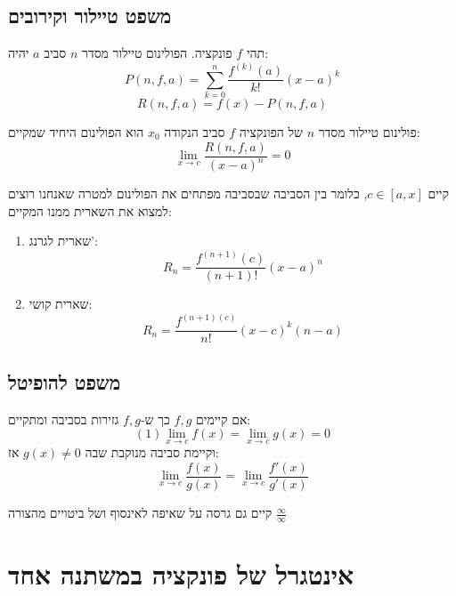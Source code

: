 \documentclass{tstextbook}
\begin{document}
\section{משפט טיילור וקירובים}

\begin{definition}
תהי \(f\) פונקציה. הפולינום טיילור מסדר \(n\) סביב \(a\) יהיה:
$$P(n,f,a)=\sum_{k=0}^n \frac{f^{(k)}(a)}{k!}(x-a)^k$$$$R(n,f,a) = f(x) - P(n, f, a)$$

\end{definition}
\begin{proposition}
פולינום טיילור מסדר \(n\) של הפונקציה \(f\) סביב הנקודה \(x_{0}\) הוא הפולינום היחיד שמקיים:
$$\lim_{x\rightarrow c} \frac{R(n,f,a)}{(x-a)^n} = 0$$

\end{proposition}
\begin{theorem}
קיים \(c\in [a,x]\), כלומר בין הסביבה שבסביבה מפתחים את הפולינום למטרה שאנחנו רוצים למצוא את השארית ממנו המקיים:

\end{theorem}
\begin{enumerate}
  \item שארית לגרנג': 
 $$R_n = \frac{f^{(n+1)}(c)}{(n+1)!}(x-a)^n$$


  \item שארית קושי: 
 $$R_n = \frac{f^{(n+1)(c)}}{n!}(x-c)^k(n-a)$$


\end{enumerate}
\section{משפט להופיטל}

\begin{theorem}[לופיטל]
אם קיימים \(f,g\) כך ש-\(f,g\) גזירות בסביבה ומתקיים:
    $$(1) \lim_{x\to c} f(x) =\lim_{x\to c} g(x) = 0$$
וקיימת סביבה מנוקבת שבה \(g(x)\neq 0\) אז:
    $$\lim_{x\rightarrow c} \frac{f(x)}{g(x)} = \lim_{x\rightarrow c} \frac{f'(x)}{g'(x)}$$

\end{theorem}
\begin{remark}
קיים גם גרסה על שאיפה לאינסוף ושל ביטויים מהצורה \(\frac{\infty}{\infty}\)

\end{remark}
\chapter{אינטגרל של פונקציה במשתנה אחד}
\end{document}
